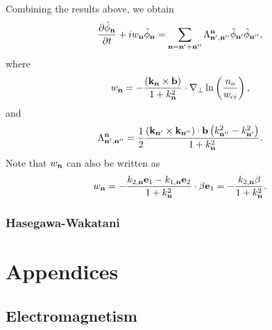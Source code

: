 \documentclass[oneside,a4paper,11pt]{report}
\begin{document}
Combining the results above, we obtain
\begin{equation}
    \frac{\partial \hat{\phi}_{\mathbf{n}}}{\partial t} + i w_{\mathbf{n}} \hat{\phi}_{\mathbf{n}} = \sum_{\mathbf{n} = \mathbf{n}' + \mathbf{n}''} \Lambda^{\mathbf{n}}_{\mathbf{n}', \mathbf{n}''} \hat{\phi}_{\mathbf{n}'} \hat{\phi}_{\mathbf{n}''},
\end{equation}
where
\begin{equation}
    w_{\mathbf{n}} = - \frac{ \left (\mathbf{k}_{\mathbf{n}} \times \mathbf{b} \right ) }{1 + k^2_{\mathbf{n}}} \cdot \nabla_\perp \ln \left ( \frac{n_o}{w_{ci}} \right ),
\end{equation}
and
\begin{equation}
    \Lambda^{\mathbf{n}}_{\mathbf{n}', \mathbf{n}''} = \frac{1}{2} \frac{  \left ( \mathbf{k}_{\mathbf{n}'} \times \mathbf{k}_{\mathbf{n}''} \right ) \cdot \mathbf{b} \left ( k^2_{\mathbf{n}''} - k^2_{\mathbf{n}'} \right ) }{1 + k^2_{\mathbf{n}}}.
\end{equation}
Note that $w_{\mathbf{n}}$ can also be written as
\begin{equation}
    w_{\mathbf{n}} = -\frac{k_{2,\mathbf{n}} \mathbf{e}_1 - k_{1,\mathbf{n}} \mathbf{e}_2}{1 + k^2_{\mathbf{n}}} \cdot \beta \mathbf{e}_1 = -\frac{k_{2,\mathbf{n}} \beta}{1 + k^2_{\mathbf{n}}}.
\end{equation}

\section{Hasegawa-Wakatani}

%
%
\part{Appendices}
%
%
\appendix

\chapter{Electromagnetism}

\end{document}
